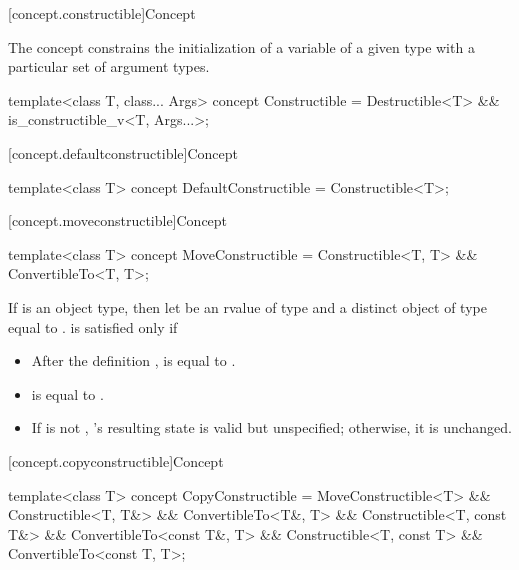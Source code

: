 [concept.constructible]{Concept }

\pnum
The  concept constrains the initialization of a
variable of a given type with a particular set of argument types.

%
\begin{itemdecl}
template<class T, class... Args>
  concept Constructible = Destructible<T> && is_constructible_v<T, Args...>;
\end{itemdecl}

[concept.defaultconstructible]{Concept }

%
\begin{itemdecl}
template<class T>
  concept DefaultConstructible = Constructible<T>;
\end{itemdecl}

[concept.moveconstructible]{Concept }

%
\begin{itemdecl}
template<class T>
  concept MoveConstructible = Constructible<T, T> && ConvertibleTo<T, T>;
\end{itemdecl}

\begin{itemdescr}
\pnum
If  is an object type, then let  be an rvalue of type
 and  a distinct object of type  equal to
.  is satisfied only if

\begin{itemize}
\item After the definition ,  is equal to .

\item {} is equal to .

\item If  is not , 's resulting state is valid
but unspecified; otherwise, it is unchanged.
\end{itemize}
\end{itemdescr}

[concept.copyconstructible]{Concept }

%
\begin{itemdecl}
template<class T>
  concept CopyConstructible =
    MoveConstructible<T> &&
    Constructible<T, T&> && ConvertibleTo<T&, T> &&
    Constructible<T, const T&> && ConvertibleTo<const T&, T> &&
    Constructible<T, const T> && ConvertibleTo<const T, T>;
\end{itemdecl}

